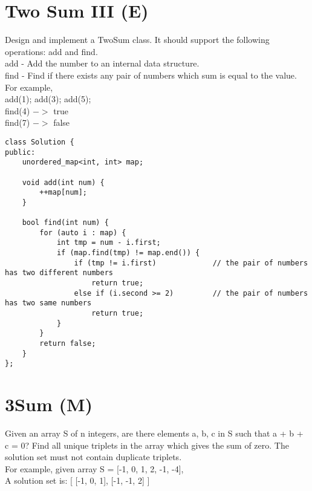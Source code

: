 \section{Two Sum III (E)}
Design and implement a TwoSum class. It should support the following operations: add and find.\\

add - Add the number to an internal data structure.\\
find - Find if there exists any pair of numbers which sum is equal to the value.\\

For example,\\
add(1); add(3); add(5);\\
find(4) $->$ true\\
find(7) $->$ false\\

\begin{lstlisting}
class Solution {
public:
    unordered_map<int, int> map;
    
    void add(int num) {
        ++map[num];
    }
    
    bool find(int num) {
        for (auto i : map) {
            int tmp = num - i.first;
            if (map.find(tmp) != map.end()) {       
                if (tmp != i.first)             // the pair of numbers has two different numbers
                    return true;
                else if (i.second >= 2)         // the pair of numbers has two same numbers
                    return true;
            }
        }
        return false;
    }
};
\end{lstlisting}


\section{3Sum (M)}
Given an array S of n integers, are there elements a, b, c in S such that a + b + c = 0? Find all unique triplets in the array which gives the sum of zero. The solution set must not contain duplicate triplets.\\

For example, given array S = [-1, 0, 1, 2, -1, -4], \\
A solution set is:
[
  [-1, 0, 1],
  [-1, -1, 2]
] \\

